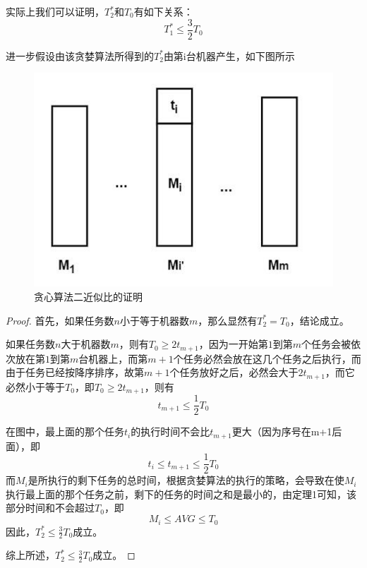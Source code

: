 实际上我们可以证明，$T_2^*$和$T_0$有如下关系：
\begin{equation*}
	T_1^*\leq \frac{3}{2} T_0
\end{equation*}

进一步假设由该贪婪算法所得到的$T_2^*$由第i台机器产生，如下图所示
\begin{figure}[hbt]
	\centering
	\includegraphics{image/greedy2-proof.jpg}
	\caption{贪心算法二近似比的证明}\label{fig:greedy2-proof}
\end{figure}

\begin{proof}
	首先，如果任务数$n$小于等于机器数$m$，那么显然有$T_2^*=T_0$，结论成立。

	如果任务数$n$大于机器数$m$，则有$T_0 \geq 2t_{m+1}$，因为一开始第$1$到第$m$个任务会被依次放在第$1$到第$m$台机器上，而第$m+1$个任务必然会放在这几个任务之后执行，而由于任务已经按降序排序，故第$m+1$个任务放好之后，必然会大于$2t_{m+1}$，而它必然小于等于$T_0$，即$T_0 \geq 2t_{m+1}$，则有
	\begin{equation*}
		t_{m+1} \leq \frac{1}{2}T_0
	\end{equation*}
	
	在图中，最上面的那个任务$t_i$的执行时间不会比$t_{m+1}$更大（因为序号在m+1后面），即
	\begin{equation*}
		t_i \leq t_{m+1} \leq \frac{1}{2}T_0
	\end{equation*}
	而$M_i$是所执行的剩下任务的总时间，根据贪婪算法的执行的策略，会导致在使$M_i$执行最上面的那个任务之前，剩下的任务的时间之和是最小的，由定理1可知，该部分时间和不会超过$T_0$，即
	\begin{equation*}
		M_i \leq AVG \leq T_0
	\end{equation*}
	因此，$T_2^*\leq \frac{3}{2}T_0$成立。

	综上所述，$T_2^*\leq \frac{3}{2}T_0$成立。
\end{proof}

